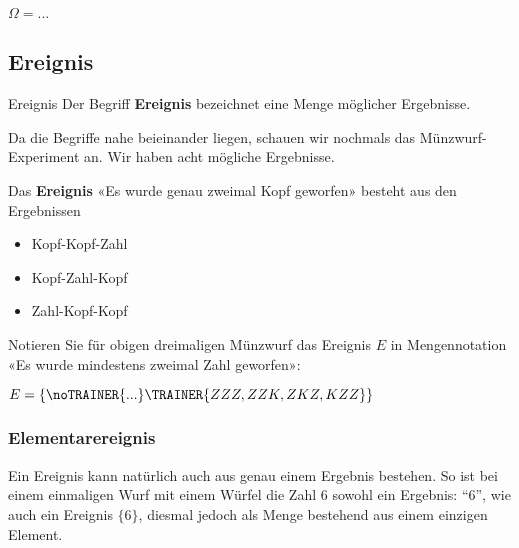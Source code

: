 $\Omega=...$



\subsection{Ereignis}
\begin{definition}{Ereignis}{}
Der Begriff \textbf{Ereignis} bezeichnet eine Menge möglicher
Ergebnisse.
\end{definition}

Da die Begriffe nahe beieinander liegen, schauen wir
nochmals das Münzwurf-Experiment an. Wir haben acht mögliche
Ergebnisse. 

Das \textbf{Ereignis} «Es wurde genau zweimal Kopf geworfen» besteht
aus den Ergebnissen

\begin{itemize}
\item Kopf-Kopf-Zahl
\item Kopf-Zahl-Kopf
\item Zahl-Kopf-Kopf
\end{itemize}

Notieren Sie für obigen dreimaligen Münzwurf das Ereignis $E$ in Mengennotation «Es wurde mindestens
zweimal Zahl geworfen»:

$E = \{\noTRAINER{...}\TRAINER{ZZZ,ZZK, ZKZ, KZZ\}}$


\newpage
\subsubsection{Elementarereignis}
\begin{bemerkung}{}{}
  Ein Ereignis kann natürlich auch aus genau einem Ergebnis bestehen. So ist bei einem einmaligen Wurf mit einem Würfel die Zahl 6 sowohl ein Ergebnis: ``6'', wie auch ein Ereignis $\{6\}$, diesmal jedoch als Menge bestehend aus einem einzigen Element. 
  \end{bemerkung}

